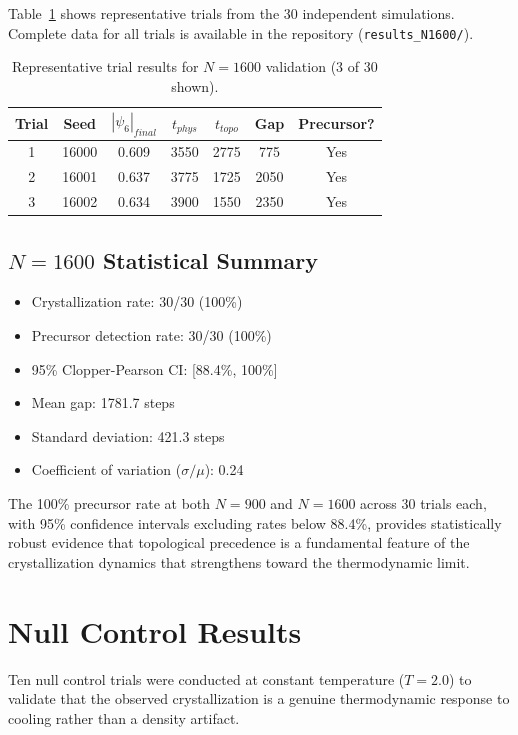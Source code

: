 \documentclass[11pt]{article}
\begin{document}
Table~\ref{tab:n1600trials} shows representative trials from the 30 independent simulations. Complete data for all trials is available in the repository (\texttt{results\_N1600/}).

\begin{table}[h]
\centering
\caption{Representative trial results for $N=1600$ validation (3 of 30 shown).}
\label{tab:n1600trials}
\begin{tabular}{ccccccc}
\toprule
\textbf{Trial} & \textbf{Seed} & \textbf{$|\psi_6|_{final}$} & \textbf{$t_{phys}$} & \textbf{$t_{topo}$} & \textbf{Gap} & \textbf{Precursor?} \\
\midrule
1 & 16000 & 0.609 & 3550 & 2775 & 775 & Yes \\
2 & 16001 & 0.637 & 3775 & 1725 & 2050 & Yes \\
3 & 16002 & 0.634 & 3900 & 1550 & 2350 & Yes \\
\bottomrule
\end{tabular}
\end{table}

\subsection{$N=1600$ Statistical Summary}

\begin{itemize}
    \item Crystallization rate: 30/30 (100\%)
    \item Precursor detection rate: 30/30 (100\%)
    \item 95\% Clopper-Pearson CI: [88.4\%, 100\%]
    \item Mean gap: 1781.7 steps
    \item Standard deviation: 421.3 steps
    \item Coefficient of variation ($\sigma/\mu$): 0.24
\end{itemize}

The 100\% precursor rate at both $N=900$ and $N=1600$ across 30 trials each, with 95\% confidence intervals excluding rates below 88.4\%, provides statistically robust evidence that topological precedence is a fundamental feature of the crystallization dynamics that strengthens toward the thermodynamic limit.

\section{Null Control Results}

Ten null control trials were conducted at constant temperature ($T = 2.0$) to validate that the observed crystallization is a genuine thermodynamic response to cooling rather than a density artifact.
\end{document}
